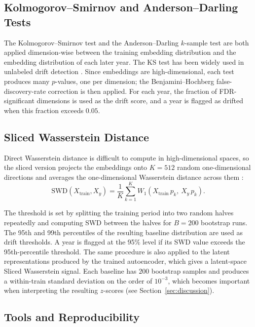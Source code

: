 \documentclass[conference]{IEEEtran}
\begin{document}
\subsection{Kolmogorov--Smirnov and Anderson--Darling Tests}

The Kolmogorov--Smirnov test and the Anderson--Darling $k$-sample test are both applied dimension-wise between the training embedding distribution and the embedding distribution of each later year. The KS test has been widely used in unlabeled drift detection \cite{abghani2020}. Since embeddings are high-dimensional, each test produces many $p$-values, one per dimension; the Benjamini--Hochberg false-discovery-rate correction \cite{benjamini1995} is then applied. For each year, the fraction of FDR-significant dimensions is used as the drift score, and a year is flagged as drifted when this fraction exceeds $0.05$.

\subsection{Sliced Wasserstein Distance}

Direct Wasserstein distance is difficult to compute in high-dimensional spaces, so the sliced version projects the embeddings onto $K = 512$ random one-dimensional directions and averages the one-dimensional Wasserstein distance across them \cite{bonneel2015}:
\begin{equation}
\mathrm{SWD}(X_{\text{train}}, X_y) = \frac{1}{K} \sum_{k=1}^{K} W_1\!\left(X_{\text{train}}\, p_k,\ X_y\, p_k\right).\label{eq:swd}
\end{equation}

The threshold is set by splitting the training period into two random halves repeatedly and computing SWD between the halves for $B = 200$ bootstrap runs. The 95th and 99th percentiles of the resulting baseline distribution are used as drift thresholds. A year is flagged at the 95\% level if its SWD value exceeds the 95th-percentile threshold. The same procedure is also applied to the latent representations produced by the trained autoencoder, which gives a latent-space Sliced Wasserstein signal. Each baseline has $200$ bootstrap samples and produces a within-train standard deviation on the order of $10^{-3}$, which becomes important when interpreting the resulting $z$-scores (see Section~\ref{sec:discussion}).

\subsection{Tools and Reproducibility}
\end{document}
